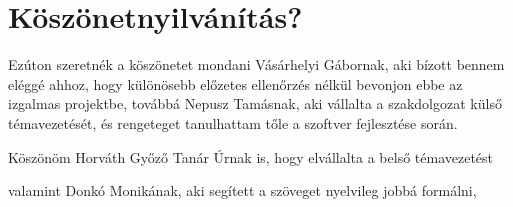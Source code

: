 \section{Köszönetnyilvánítás?}

Ezúton szeretnék a köszönetet mondani Vásárhelyi Gábornak, aki bízott bennem eléggé ahhoz, hogy különösebb előzetes ellenőrzés nélkül bevonjon ebbe az izgalmas projektbe, továbbá Nepusz Tamásnak, aki vállalta a szakdolgozat külső  témavezetését, és rengeteget tanulhattam tőle a szoftver fejlesztése során.

Köszönöm Horváth Győző Tanár Úrnak is, hogy elvállalta a belső témavezetést

valamint Donkó Monikának, aki segített a szöveget nyelvileg jobbá formálni,
